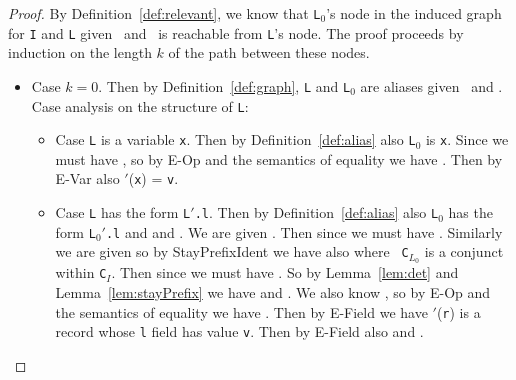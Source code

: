 \begin{proof}

By Definition~\ref{def:relevant}, we know that {\tt L$_0$}'s node in the induced
graph for {\tt I} and {\tt L} given \Euid\ and \Huid\ is reachable
from {\tt L}'s node.  The proof proceeds by
induction on the length $k$ of the path between these nodes.
\begin{itemize}
\item Case $k=0$.  Then by Definition~\ref{def:graph}, {\tt L} and {\tt L$_0$}
  are aliases given \Euid\ and \Huid.  Case analysis on the structure
  of {\tt L}:
  \begin{itemize}
  \item Case {\tt L} is a variable {\tt x}.  Then by
  Definition~\ref{def:alias} also
 {\tt L$_0$} is {\tt x}.  Since
 we must have , so by {\sc
   E-Op} and the semantics of equality we have
 .  Then by
 {\sc E-Var} also \Euid$'$({\tt x}) =
  {\tt v}.

  \item Case {\tt L} has the form {\tt L$'$.l}.  Then by
    Definition~\ref{def:alias} also {\tt L$_0$} has the
    form {\tt L$_0'$.l} and 
    and .  
We are given 
. Then since 
 we must have .
Similarly we are given 
 so by {\sc StayPrefixIdent} we
have also  where {\tt
  C$_{L_0}$} is a conjunct within {\tt C$_I$}.  Then since 
 we must have .  So by
Lemma~\ref{lem:det} and Lemma~\ref{lem:stayPrefix} we have 
 and
.  
 We also know , so by {\sc
   E-Op} and the semantics of equality we have
 .  Then by
 {\sc E-Field} we have \Huid$'$({\tt r}) is a record whose {\tt l}
 field has value {\tt v}.  Then by {\sc E-Field} also 
and .

  \end{itemize}


\end{itemize}
\end{proof}
